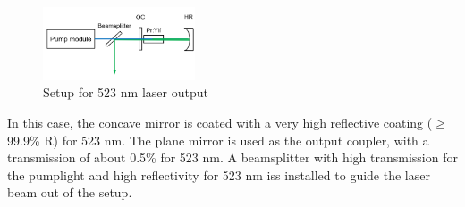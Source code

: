 \documentclass[conference]{IEEEtran}
\begin{document}
\begin{figure}[h]
	\centering
	\includegraphics[width=0.4\textwidth]{img/setup523}
	\caption{Setup for 523 nm laser output}
	\label{setup523}
\end{figure}
In this case, the concave mirror is coated with a very high reflective coating ($\geq$ 99.9\% R) for 523 nm. The plane mirror is used as the output coupler, with a transmission of about 0.5\% for 523 nm. A beamsplitter with high transmission for the pumplight and high reflectivity for 523 nm iss installed to guide the laser beam out of the setup. 
\end{document}
